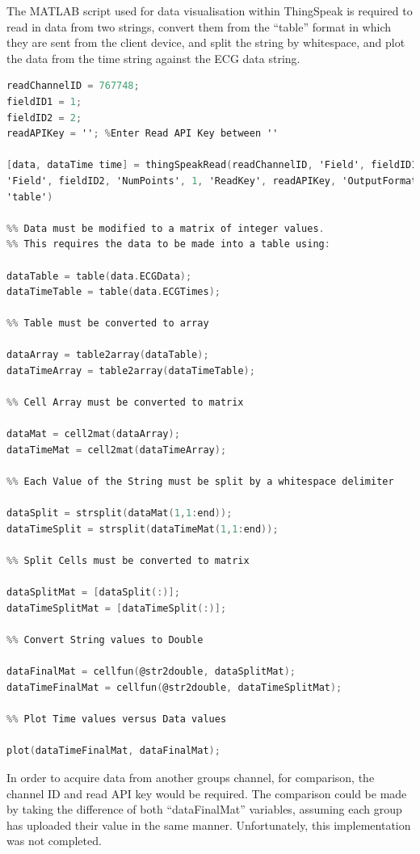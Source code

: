 \documentclass[11pt,a4paper,headinclude=false,footinclude=false]{scrreprt}
\begin{document}
The MATLAB script used for data visualisation within ThingSpeak is
required to read in data from two strings, convert them from the
``table'' format in which they are sent from the client device, and
split the string by whitespace, and plot the data from the time string
against the ECG data string.

\lstset{
    caption=ThingSpeak MATLAB Code,
    basicstyle=\footnotesize, frame=tb,
    xleftmargin=.1\textwidth, xrightmargin=.1\textwidth
}
\begin{lstlisting}[language=C]
readChannelID = 767748;
fieldID1 = 1;
fieldID2 = 2;
readAPIKey = ''; %Enter Read API Key between ''

[data, dataTime time] = thingSpeakRead(readChannelID, 'Field', fieldID1,
'Field', fieldID2, 'NumPoints', 1, 'ReadKey', readAPIKey, 'OutputFormat',
'table')

%% Data must be modified to a matrix of integer values.
%% This requires the data to be made into a table using:

dataTable = table(data.ECGData);
dataTimeTable = table(data.ECGTimes);

%% Table must be converted to array

dataArray = table2array(dataTable);
dataTimeArray = table2array(dataTimeTable);

%% Cell Array must be converted to matrix

dataMat = cell2mat(dataArray);
dataTimeMat = cell2mat(dataTimeArray);

%% Each Value of the String must be split by a whitespace delimiter

dataSplit = strsplit(dataMat(1,1:end));
dataTimeSplit = strsplit(dataTimeMat(1,1:end));

%% Split Cells must be converted to matrix

dataSplitMat = [dataSplit(:)];
dataTimeSplitMat = [dataTimeSplit(:)];

%% Convert String values to Double

dataFinalMat = cellfun(@str2double, dataSplitMat);
dataTimeFinalMat = cellfun(@str2double, dataTimeSplitMat);

%% Plot Time values versus Data values

plot(dataTimeFinalMat, dataFinalMat);
\end{lstlisting}

In order to acquire data from another groups channel, for comparison,
the channel ID and read API key would be required. The comparison could
be made by taking the difference of both ``dataFinalMat'' variables,
assuming each group has uploaded their value in the same manner.
Unfortunately, this implementation was not completed.
\end{document}
